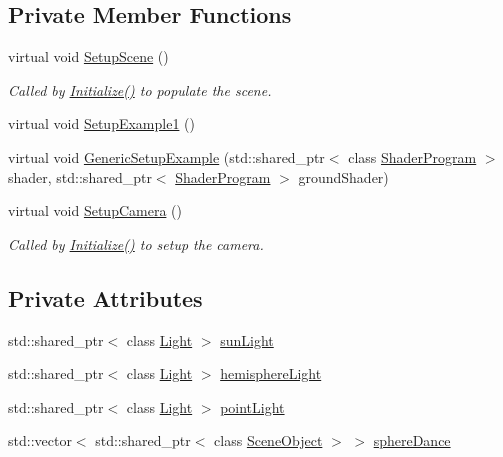 \subsection*{Private Member Functions}
\begin{DoxyCompactItemize}
\item
virtual void \hyperlink{class_assignment4_a38c50647bb65ff03aaf293fcc21dc5fd}{Setup\+Scene} ()
\begin{DoxyCompactList}\small\item\em Called by \hyperlink{class_application_a17cf1ea4552d26a1c20f7d98d793d41d}{Initialize()} to populate the scene. \end{DoxyCompactList}\item
virtual void \hyperlink{class_assignment4_a019c1cc10bd21a91a88e68e11f86b846}{Setup\+Example1} ()
\item
virtual void \hyperlink{class_assignment4_a440d520fc872a49fade29aa1eb7643d0}{Generic\+Setup\+Example} (std\+::shared\+\_\+ptr$<$ class \hyperlink{class_shader_program}{Shader\+Program} $>$ shader, std\+::shared\+\_\+ptr$<$ \hyperlink{class_shader_program}{Shader\+Program} $>$ ground\+Shader)
\item
virtual void \hyperlink{class_assignment4_aa2bc15adb48cf54e477fce0c686cf2f0}{Setup\+Camera} ()
\begin{DoxyCompactList}\small\item\em Called by \hyperlink{class_application_a17cf1ea4552d26a1c20f7d98d793d41d}{Initialize()} to setup the camera. \end{DoxyCompactList}\end{DoxyCompactItemize}
\subsection*{Private Attributes}
\begin{DoxyCompactItemize}
\item
std\+::shared\+\_\+ptr$<$ class \hyperlink{class_light}{Light} $>$ \hyperlink{class_assignment4_ab2981232ba58193de1682308a1dbafdc}{sun\+Light}
\item
std\+::shared\+\_\+ptr$<$ class \hyperlink{class_light}{Light} $>$ \hyperlink{class_assignment4_a2ea813219380cc65ef89749586f5d4b5}{hemisphere\+Light}
\item
std\+::shared\+\_\+ptr$<$ class \hyperlink{class_light}{Light} $>$ \hyperlink{class_assignment4_a327ee7158090e2a2db8763df3cb8608d}{point\+Light}
\item
std\+::vector$<$ std\+::shared\+\_\+ptr$<$ class \hyperlink{class_scene_object}{Scene\+Object} $>$ $>$ \hyperlink{class_assignment4_aa16802895aa2aef461d130479c81a015}{sphere\+Dance}
\end{DoxyCompactItemize}
